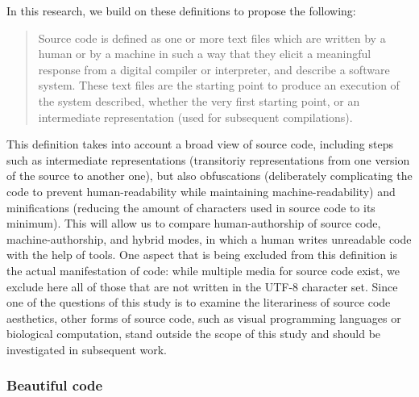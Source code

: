 In this research, we build on these definitions to propose the following:

\begin{quote}
    Source code is defined as one or more text files which are written by a human or by a machine in such a way that they elicit a meaningful response from a digital compiler or interpreter, and describe a software system. These text files are the starting point to produce an execution of the system described, whether the very first starting point, or an intermediate representation (used for subsequent compilations).
\end{quote}

This definition takes into account a broad view of source code, including steps such as intermediate representations (transitoriy representations from one version of the source to another one), but also obfuscations (deliberately complicating the code to prevent human-readability while maintaining machine-readability) and minifications (reducing the amount of characters used in source code to its minimum). This will allow us to compare human-authorship of source code, machine-authorship, and hybrid modes, in which a human writes unreadable code with the help of tools. One aspect that is being excluded from this definition is the actual manifestation of code: while multiple media for source code exist, we exclude here all of those that are not written in the UTF-8 character set. Since one of the questions of this study is to examine the literariness of source code aesthetics, other forms of source code, such as visual programming languages or biological computation, stand outside the scope of this study and should be investigated in subsequent work.

\subsubsection{Beautiful code}


